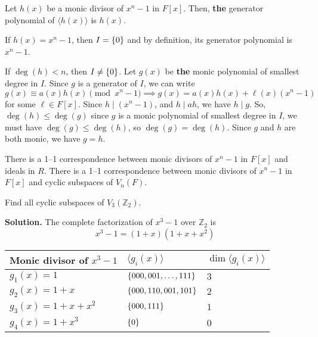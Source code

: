 \begin{Theorem}{}{}
    Let $ h(x) $ be a monic divisor of $ x^n-1 $ in $ F[x] $.
    Then, \textbf{the} generator polynomial of $ \langle h(x)\rangle $
    is $ h(x) $.
\end{Theorem}

\begin{Proof}{}{}
    If $ h(x)=x^n-1 $, then $ I=\{0\} $ and by definition, its
    generator polynomial is $ x^n-1 $.

    If $ \deg(h)<n $, then $ I\neq \{0\} $. Let $ g(x) $
    be \textbf{the} monic polynomial of smallest degree in $ I $.
    Since $ g $ is a generator of $ I $, we can write
    \[ g(x)\equiv a(x)h(x)\pmod{x^n-1}\implies g(x)=a(x)h(x)+\ell(x)(x^n-1) \]
    for some $ \ell\in F[x] $. Since $ h\mid (x^n-1) $, and $ h\mid ah $,
    we have $ h\mid g $. So, $ \deg(h)\leqslant \deg(g) $ since
    $ g $ is a monic polynomial of smallest degree in $ I $,
    we must have $ \deg(g)\leqslant \deg(h) $, so $ \deg(g)=\deg(h) $.
    Since $ g $ and $ h $ are both monic, we have
    $ g=h $.
\end{Proof}

\begin{Corollary}{}{}
    There is a 1--1 correspondence between monic
    divisors of $ x^n-1 $ in $ F[x] $ and ideals in $ R $.
    There is a 1--1 correspondence between monic
    divisors of $ x^n-1 $ in $ F[x] $ and cyclic
    subspaces of $ V_n(F) $.
\end{Corollary}

\begin{Example}{}{}
    Find all cyclic subspaces of $ V_3(\mathbb{Z}_2) $.

    \textbf{Solution.} The complete factorization
    of $ x^3-1 $ over $ \mathbb{Z}_2 $ is
    \[ x^3-1=(1+x)(1+x+x^2) \]

    \begin{table}[H]
        \centering
        \begin{tabularx}{0.8\linewidth}{@{}YYY@{}}
            Monic divisor of $ x^3-1 $ & $ \langle g_i(x) \rangle $    & $ \dim \langle g_i(x) \rangle $ \\
            \midrule
            \midrule
            $ g_1(x)=1 $               & $ \{000,001,\ldots ,111\} $ & $ 3 $                           \\
            \midrule
            $ g_2(x)=1+x $             & $ \{000,110,001,101\} $     & $ 2 $                           \\
            \midrule
            $ g_3(x)=1+x+x^2 $         & $ \{000,111\} $             & $ 1 $                           \\
            \midrule
            $ g_4(x)=1+x^3 $           & $ \{0\} $                   & $ 0 $                           \\
        \end{tabularx}
    \end{table}
\end{Example}
